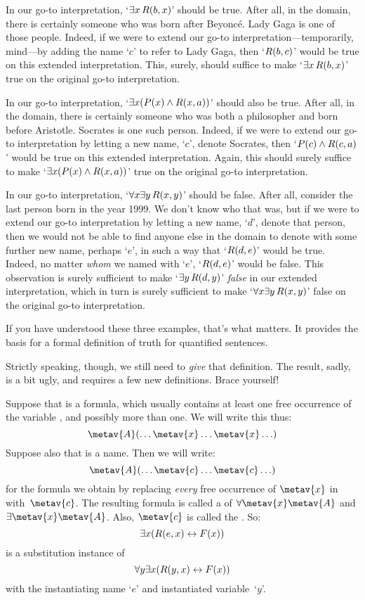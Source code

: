In our go-to interpretation, `$\exists x\, \mathord{R}(b,x)$' should be true. After all, in the domain, there is certainly someone who was born after Beyonc\'e. Lady Gaga is one of those people. Indeed, if we were to extend our go-to interpretation---temporarily, mind---by adding the name `$c$' to refer to Lady Gaga, then `$\mathord{R}(b,c)$' would be true on this extended interpretation. This, surely, should suffice to make `$\exists x\, \mathord{R}(b,x)$' true on the original go-to interpretation.

In our go-to interpretation, `$\exists x (\mathord{P}(x) \wedge \mathord{R}(x,a))$' should also be true. After all, in the domain, there is certainly someone who was both a philosopher and born before Aristotle. Socrates is one such person. Indeed, if we were to extend our go-to interpretation by letting a new name, `$c$', denote Socrates, then `$\mathord{P}(c) \wedge \mathord{R}(c,a)$' would be true on this extended interpretation. Again, this should surely suffice to make `$\exists x (\mathord{P}(x) \wedge \mathord{R}(x,a))$' true on the original go-to interpretation.

In our go-to interpretation, `$\forall x \exists y\, \mathord{R}(x,y)$' should be false. After all, consider the last person born in the year 1999. We don't know who that was, but if we were to extend our go-to interpretation by letting a new name, `$d$', denote that person, then we would not be able to find anyone else in the domain to denote with some further new name, perhaps `$e$', in such a way that `$\mathord{R}(d,e)$' would be true. Indeed, no matter \emph{whom} we named with `$e$', `$\mathord{R}(d,e)$' would be false. This observation is surely sufficient to make `$\exists y\, \mathord{R}(d,y)$' \emph{false} in our extended interpretation, which in turn is surely sufficient to make `$\forall x \exists y\, \mathord{R}(x,y)$' false on the original go-to interpretation.

If you have understood these three examples, that's what matters. It provides the basis for a formal definition of truth for quantified sentences.

Strictly speaking, though, we still need to \emph{give} that definition. The result, sadly, is a bit ugly, and requires a few new definitions. Brace yourself!

Suppose that  is a formula, which usually contains at least
one free occurrence of the variable , and possibly more than one. We will write this thus:
$$\metav{A}(\ldots \metav{x} \ldots \metav{x} \ldots)$$
Suppose also that  is a name. Then we will write:
$$\metav{A}(\ldots \metav{c} \ldots \metav{c} \ldots)$$
for the formula we obtain by replacing \emph{every} free occurrence of $\metav{x}$ in  with~$\metav{c}$. The resulting formula is called a  of $\forall \metav{x}\metav{A}$ and $\exists\metav{x}\metav{A}$.  Also, $\metav{c}$ is called the . So:
	$$\exists x (\mathord{R}(e,x) \leftrightarrow \mathord{F}(x))$$
is a substitution instance of 
	$$\forall y \exists x (\mathord{R}(y,x) \leftrightarrow \mathord{F}(x))$$
with the instantiating name `$e$' and instantiated variable~`$y$'.

